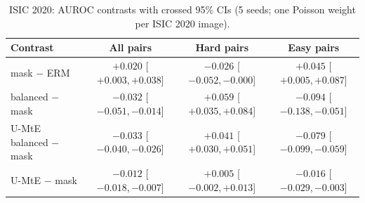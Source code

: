 \begin{table}[H]\centering\scriptsize
\caption{ISIC 2020: AUROC contrasts with crossed 95\% CIs (5 seeds; one Poisson weight per ISIC 2020 image).}\label{tab:r10b}
\begin{tabular}{lccc}\toprule
Contrast & All pairs & Hard pairs & Easy pairs \\\midrule
mask $-$ ERM & $+0.020$ [$+0.003, +0.038$] & $-0.026$ [$-0.052, -0.000$] & $+0.045$ [$+0.005, +0.087$] \\
balanced $-$ mask & $-0.032$ [$-0.051, -0.014$] & $+0.059$ [$+0.035, +0.084$] & $-0.094$ [$-0.138, -0.051$] \\
U-MtE balanced $-$ mask & $-0.033$ [$-0.040, -0.026$] & $+0.041$ [$+0.030, +0.051$] & $-0.079$ [$-0.099, -0.059$] \\
U-MtE $-$ mask & $-0.012$ [$-0.018, -0.007$] & $+0.005$ [$-0.002, +0.013$] & $-0.016$ [$-0.029, -0.003$] \\
\bottomrule\end{tabular}
\end{table}

